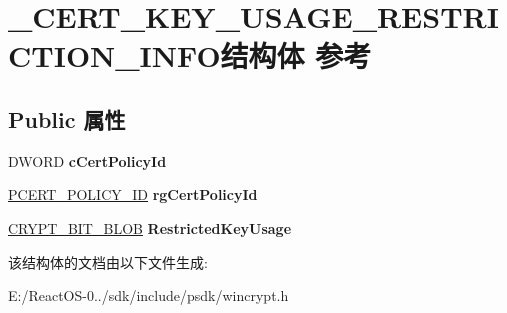 \hypertarget{struct___c_e_r_t___k_e_y___u_s_a_g_e___r_e_s_t_r_i_c_t_i_o_n___i_n_f_o}{}\section{\+\_\+\+C\+E\+R\+T\+\_\+\+K\+E\+Y\+\_\+\+U\+S\+A\+G\+E\+\_\+\+R\+E\+S\+T\+R\+I\+C\+T\+I\+O\+N\+\_\+\+I\+N\+F\+O结构体 参考}
\label{struct___c_e_r_t___k_e_y___u_s_a_g_e___r_e_s_t_r_i_c_t_i_o_n___i_n_f_o}
\subsection*{Public 属性}
\begin{DoxyCompactItemize}
\item 
\mbox{\label{struct___c_e_r_t___k_e_y___u_s_a_g_e___r_e_s_t_r_i_c_t_i_o_n___i_n_f_o_a24dd9183b2affbafaba0676425e8694c}} 
D\+W\+O\+RD {\bfseries c\+Cert\+Policy\+Id}
\item 
\mbox{\label{struct___c_e_r_t___k_e_y___u_s_a_g_e___r_e_s_t_r_i_c_t_i_o_n___i_n_f_o_a5016f3858900d07d1b61ccda518834e8}} 
\hyperlink{struct___c_e_r_t___p_o_l_i_c_y___i_d}{P\+C\+E\+R\+T\+\_\+\+P\+O\+L\+I\+C\+Y\+\_\+\+ID} {\bfseries rg\+Cert\+Policy\+Id}
\item 
\mbox{\label{struct___c_e_r_t___k_e_y___u_s_a_g_e___r_e_s_t_r_i_c_t_i_o_n___i_n_f_o_a32b1328f7a5dfb869b1a601010e11f96}} 
\hyperlink{struct___c_r_y_p_t___b_i_t___b_l_o_b}{C\+R\+Y\+P\+T\+\_\+\+B\+I\+T\+\_\+\+B\+L\+OB} {\bfseries Restricted\+Key\+Usage}
\end{DoxyCompactItemize}


该结构体的文档由以下文件生成\+:\begin{DoxyCompactItemize}
\item 
E\+:/\+React\+O\+S-\/0../sdk/include/psdk/wincrypt.\+h\end{DoxyCompactItemize}
